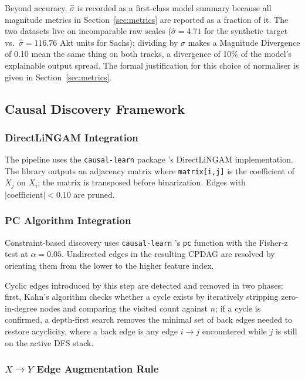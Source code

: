 \documentclass[12pt,a4paper,oneside]{article}
\begin{document}
Beyond accuracy, $\hat{\sigma}$ is recorded as a first-class model summary because all magnitude metrics in Section~\ref{sec:metrics} are reported as a fraction of it. The two datasets live on incomparable raw scales ($\hat{\sigma} = 4.71$ for the synthetic target vs.\ $\hat{\sigma} = 116.76$ Akt units for Sachs); dividing by $\hat{\sigma}$ makes a Magnitude Divergence of 0.10 mean the same thing on both tracks, a divergence of 10\% of the model's explainable output spread. The formal justification for this choice of normaliser is given in Section~\ref{sec:metrics}.

\subsection{Causal Discovery Framework}

\subsubsection{DirectLiNGAM Integration}

The pipeline uses the \texttt{causal-learn} package \citep{Zheng2024}'s DirectLiNGAM implementation. The library outputs an adjacency matrix where \texttt{matrix[i,j]} is the coefficient of $X_j$ on $X_i$; the matrix is transposed before binarization. Edges with $|\mathrm{coefficient}| < 0.10$ are pruned.

\subsubsection{PC Algorithm Integration}

Constraint-based discovery uses \texttt{causal-learn} \citep{Zheng2024}'s \texttt{pc} function with the Fisher-z test at $\alpha = 0.05$. Undirected edges in the resulting CPDAG are resolved by orienting them from the lower to the higher feature index. 

Cyclic edges introduced by this step are detected and removed in two phases: first, Kahn's algorithm checks whether a cycle exists by iteratively stripping zero-in-degree nodes and comparing the visited count against $n$; if a cycle is confirmed, a depth-first search removes the minimal set of back edges needed to restore acyclicity, where a back edge is any edge $i \to j$ encountered while $j$ is still on the active DFS stack.

\subsubsection{\texorpdfstring{$X \to Y$}{X→Y} Edge Augmentation Rule}
\end{document}
